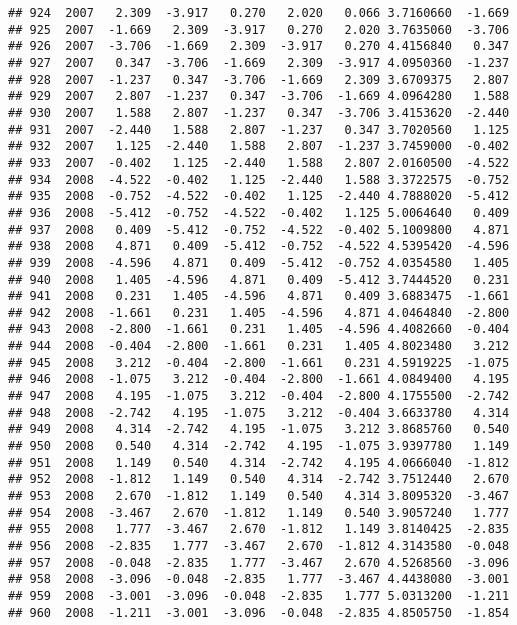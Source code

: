 \documentclass[]{article}
\begin{document}
\begin{verbatim}
## 924  2007   2.309  -3.917   0.270   2.020   0.066 3.7160660  -1.669
## 925  2007  -1.669   2.309  -3.917   0.270   2.020 3.7635060  -3.706
## 926  2007  -3.706  -1.669   2.309  -3.917   0.270 4.4156840   0.347
## 927  2007   0.347  -3.706  -1.669   2.309  -3.917 4.0950360  -1.237
## 928  2007  -1.237   0.347  -3.706  -1.669   2.309 3.6709375   2.807
## 929  2007   2.807  -1.237   0.347  -3.706  -1.669 4.0964280   1.588
## 930  2007   1.588   2.807  -1.237   0.347  -3.706 3.4153620  -2.440
## 931  2007  -2.440   1.588   2.807  -1.237   0.347 3.7020560   1.125
## 932  2007   1.125  -2.440   1.588   2.807  -1.237 3.7459000  -0.402
## 933  2007  -0.402   1.125  -2.440   1.588   2.807 2.0160500  -4.522
## 934  2008  -4.522  -0.402   1.125  -2.440   1.588 3.3722575  -0.752
## 935  2008  -0.752  -4.522  -0.402   1.125  -2.440 4.7888020  -5.412
## 936  2008  -5.412  -0.752  -4.522  -0.402   1.125 5.0064640   0.409
## 937  2008   0.409  -5.412  -0.752  -4.522  -0.402 5.1009800   4.871
## 938  2008   4.871   0.409  -5.412  -0.752  -4.522 4.5395420  -4.596
## 939  2008  -4.596   4.871   0.409  -5.412  -0.752 4.0354580   1.405
## 940  2008   1.405  -4.596   4.871   0.409  -5.412 3.7444520   0.231
## 941  2008   0.231   1.405  -4.596   4.871   0.409 3.6883475  -1.661
## 942  2008  -1.661   0.231   1.405  -4.596   4.871 4.0464840  -2.800
## 943  2008  -2.800  -1.661   0.231   1.405  -4.596 4.4082660  -0.404
## 944  2008  -0.404  -2.800  -1.661   0.231   1.405 4.8023480   3.212
## 945  2008   3.212  -0.404  -2.800  -1.661   0.231 4.5919225  -1.075
## 946  2008  -1.075   3.212  -0.404  -2.800  -1.661 4.0849400   4.195
## 947  2008   4.195  -1.075   3.212  -0.404  -2.800 4.1755500  -2.742
## 948  2008  -2.742   4.195  -1.075   3.212  -0.404 3.6633780   4.314
## 949  2008   4.314  -2.742   4.195  -1.075   3.212 3.8685760   0.540
## 950  2008   0.540   4.314  -2.742   4.195  -1.075 3.9397780   1.149
## 951  2008   1.149   0.540   4.314  -2.742   4.195 4.0666040  -1.812
## 952  2008  -1.812   1.149   0.540   4.314  -2.742 3.7512440   2.670
## 953  2008   2.670  -1.812   1.149   0.540   4.314 3.8095320  -3.467
## 954  2008  -3.467   2.670  -1.812   1.149   0.540 3.9057240   1.777
## 955  2008   1.777  -3.467   2.670  -1.812   1.149 3.8140425  -2.835
## 956  2008  -2.835   1.777  -3.467   2.670  -1.812 4.3143580  -0.048
## 957  2008  -0.048  -2.835   1.777  -3.467   2.670 4.5268560  -3.096
## 958  2008  -3.096  -0.048  -2.835   1.777  -3.467 4.4438080  -3.001
## 959  2008  -3.001  -3.096  -0.048  -2.835   1.777 5.0313200  -1.211
## 960  2008  -1.211  -3.001  -3.096  -0.048  -2.835 4.8505750  -1.854

\end{verbatim}
\end{document}
